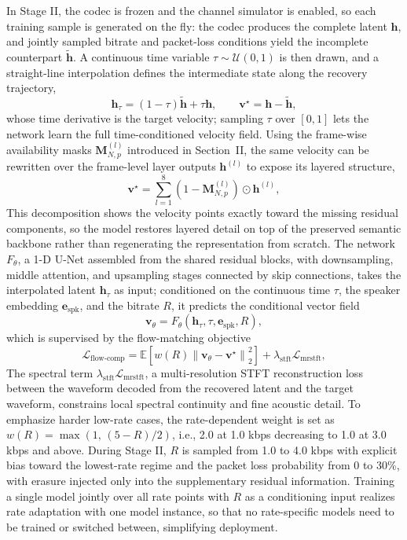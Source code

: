 \documentclass[lettersize,journal]{IEEEtran}
\begin{document}
In Stage II, the codec is frozen and the channel simulator is enabled, so each training sample is generated on the fly: the codec produces the complete latent $\mathbf{h}$, and jointly sampled bitrate and packet-loss conditions yield the incomplete counterpart $\widetilde{\mathbf{h}}$. A continuous time variable $\tau\sim\mathcal{U}(0,1)$ is then drawn, and a straight-line interpolation defines the intermediate state along the recovery trajectory,
\begin{equation}
\mathbf{h}_{\tau}=(1-\tau)\widetilde{\mathbf{h}}+\tau\mathbf{h},
\qquad
\mathbf{v}^{\star}=\mathbf{h}-\widetilde{\mathbf{h}},
\end{equation}
whose time derivative is the target velocity; sampling $\tau$ over $[0,1]$ lets the network learn the full time-conditioned velocity field. Using the frame-wise availability masks $\mathbf{M}^{(l)}_{N,p}$ introduced in Section~II, the same velocity can be rewritten over the frame-level layer outputs $\mathbf{h}^{(l)}$ to expose its layered structure,
\begin{equation}
\mathbf{v}^{\star}=
\sum_{l=1}^{8}\left(1-\mathbf{M}^{(l)}_{N,p}\right)\odot \mathbf{h}^{(l)},
\end{equation}
This decomposition shows the velocity points exactly toward the missing residual components, so the model restores layered detail on top of the preserved semantic backbone rather than regenerating the representation from scratch. The network $F_{\theta}$, a 1-D U-Net assembled from the shared residual blocks, with downsampling, middle attention, and upsampling stages connected by skip connections, takes the interpolated latent $\mathbf{h}_{\tau}$ as input; conditioned on the continuous time $\tau$, the speaker embedding $\mathbf{e}_{\mathrm{spk}}$, and the bitrate $R$, it predicts the conditional vector field
\begin{equation}
\mathbf{v}_{\theta}=F_{\theta}(\mathbf{h}_{\tau},\tau,\mathbf{e}_{\mathrm{spk}},R),
\end{equation}
which is supervised by the flow-matching objective
\begin{equation}
\mathcal{L}_{\mathrm{flow\text{-}comp}}=\mathbb{E}\!\left[w(R)\left\|\mathbf{v}_{\theta}-\mathbf{v}^{\star}\right\|_2^2\right]+\lambda_{\mathrm{stft}}\mathcal{L}_{\mathrm{mrstft}},
\end{equation}
The spectral term $\lambda_{\mathrm{stft}}\mathcal{L}_{\mathrm{mrstft}}$, a multi-resolution STFT reconstruction loss between the waveform decoded from the recovered latent and the target waveform, constrains local spectral continuity and fine acoustic detail. To emphasize harder low-rate cases, the rate-dependent weight is set as $w(R)=\max\!\left(1,\,(5-R)/2\right)$, i.e., 2.0 at 1.0 kbps decreasing to 1.0 at 3.0 kbps and above. During Stage II, $R$ is sampled from 1.0 to 4.0 kbps with explicit bias toward the lowest-rate regime and the packet loss probability from 0 to 30\%, with erasure injected only into the supplementary residual information. Training a single model jointly over all rate points with $R$ as a conditioning input realizes rate adaptation with one model instance, so that no rate-specific models need to be trained or switched between, simplifying deployment.
\end{document}
